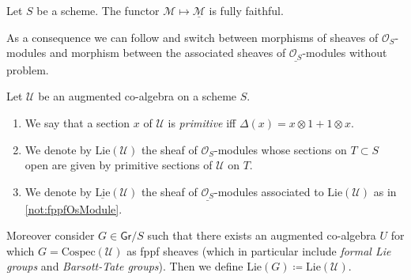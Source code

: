 \begin{prop}
	Let $S$ be a scheme. 
	The functor $\mathcal{M} \mapsto \underline{\mathcal{M}}$
	is fully faithful.
\end{prop}


\begin{rem}[]
	As a consequence we can follow \cite[]{Messing} and switch
	between morphisms of sheaves of $\mathcal{O}_{ S }$-modules and morphism
	between the associated sheaves of $\underline{\mathcal{O}_{ S }}$-modules without problem.
\end{rem}


\begin{defn}[]
	Let $\mathcal{U}$ be an augmented co-algebra on a scheme $S$.
\begin{enumerate}
\item We say that a section $x$ of $\mathcal{U}$ is {\em primitive} iff
	$\Delta(x) = x \otimes 1 + 1 \otimes x$.

\item We denote by $\mathrm{Lie}(\mathcal{U})$ the sheaf of $\mathcal{O}_{ S }$-modules
	whose sections on $T \subset S$ open are given by
	primitive sections of $\mathcal{U}$ on $T$.

\item We denote by $\underline{\mathrm{Lie}}(\mathcal{U})$ 
	the sheaf of $\underline{\mathcal{O}_{ S }}$-modules
	associated to $\mathrm{Lie}(\mathcal{U})$ as in \cref{not:fppfOsModule}.
\end{enumerate}
	Moreover consider $G \in \mathsf{Gr}/S$ such that there exists an
	augmented co-algebra $U$ for which $G = \mathrm{Cospec}(\mathcal{U})$ as
	fppf sheaves (which in particular include {\em formal Lie groups} and {\em Barsott-Tate groups}).
	Then we define $\mathrm{Lie}(G) \coloneqq \mathrm{Lie}(\mathcal{U})$.
\end{defn}


